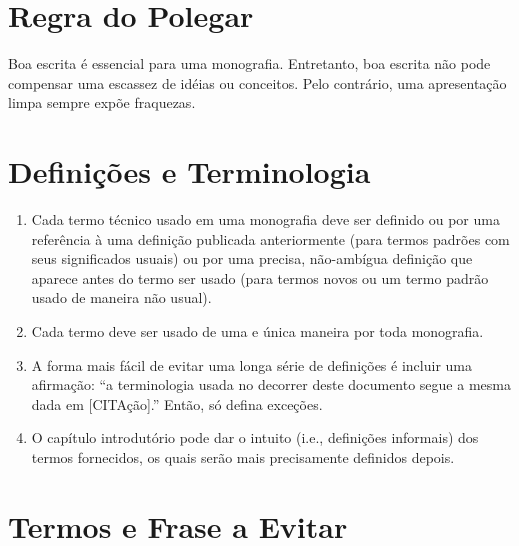 \section{Regra do Polegar}

Boa escrita \'{e} essencial para uma monografia. Entretanto, boa escrita n\~{a}o pode compensar uma escassez de id\'{e}ias ou conceitos.
Pelo contr\'{a}rio, uma apresenta\c{c}\~{a}o limpa sempre exp\~{o}e fraquezas.

\section{Defini\c{c}\~{o}es e Terminologia}

\begin{enumerate}

	\item Cada termo t\'{e}cnico usado em uma monografia deve ser definido ou por uma referência à uma defini\c{c}\~{a}o publicada anteriormente (para termos padr\~{o}es com seus significados usuais)
	ou por uma precisa, n\~{a}o-amb\'{i}gua defini\c{c}\~{a}o que aparece antes do termo ser usado (para termos novos ou um termo padr\~{a}o usado de maneira n\~{a}o usual).

	\item Cada termo deve ser usado de uma e \'{u}nica maneira por toda monografia.			

	\item A forma mais f\'{a}cil de evitar uma longa s\'{e}rie de defini\c{c}\~{o}es \'{e} incluir uma afirma\c{c}\~{a}o: ``a terminologia usada no decorrer deste documento segue a mesma dada em [CITA\c{c}\~{a}o].''
	Ent\~{a}o, s\'{o} defina exce\c{c}\~{o}es.

	\item O cap\'{i}tulo introdut\'{o}rio pode dar o intuito (i.e., defini\c{c}\~{o}es informais) dos termos fornecidos, os quais ser\~{a}o mais precisamente definidos depois.

\end{enumerate}

\section{Termos e Frase a Evitar}
	
